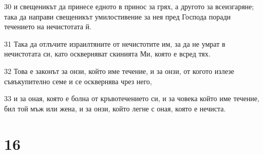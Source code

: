 \par 30 и свещеникът да принесе едното в принос за грях, а другото за всеизгаряне; така да направи свещеникът умилостивение за нея пред Господа поради течението на нечистотата й.
\par 31 Така да отлъчите израилтяните от нечистотите им, за да не умрат в нечистотата си, като оскверняват скинията Ми, която е всред тях.
\par 32 Това е законът за онзи, който име течение, и за онзи, от когото излезе съвъкупително семе и се осквернява чрез него,
\par 33 и за оная, която е болна от кръвотечението си, и за човека който име течение, бил той мъж или жена, и за онзи, който легне с оная, която е нечиста.

\chapter{16}

